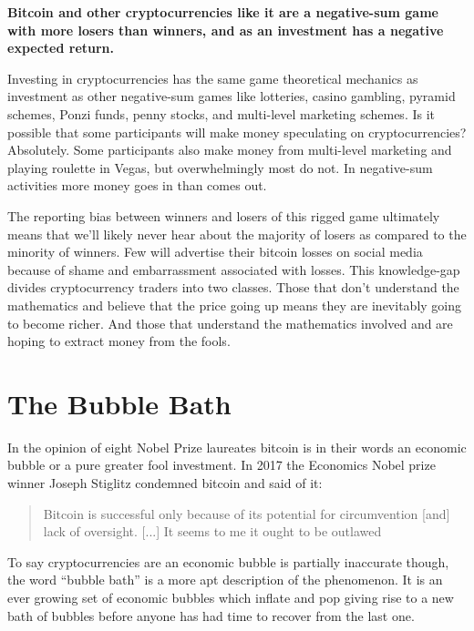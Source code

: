\begin{infobox}
 \textbf{Bitcoin and other cryptocurrencies like it are a negative-sum game with
  more losers than winners, and as an investment has a negative expected
  return.}
\end{infobox}


Investing in cryptocurrencies has the same game theoretical mechanics as
investment as other negative-sum games like lotteries, casino gambling, pyramid
schemes, Ponzi funds, penny stocks, and multi-level marketing schemes. Is it
possible that some participants will make money speculating on cryptocurrencies?
Absolutely. Some participants also make money from multi-level marketing and
playing roulette in Vegas, but overwhelmingly most do not. In negative-sum
activities more money goes in than comes out.


The reporting bias between winners and losers of this rigged game ultimately
means that we'll likely never hear about the majority of losers as compared to
the minority of winners. Few will advertise their bitcoin losses on social media
because of shame and embarrassment associated with losses. This knowledge-gap
divides cryptocurrency traders into two classes. Those that don't understand the
mathematics and believe that the price going up means they are inevitably going
to become richer. And those that understand the mathematics involved and are
hoping to extract money from the fools.
\cite{shifflett2018some, makarov2020trading}


\section{The Bubble Bath}


In the opinion of eight Nobel Prize laureates bitcoin is in their words an
economic bubble or a pure greater fool investment. In 2017 the Economics Nobel
prize winner Joseph Stiglitz condemned bitcoin and said of it:

\begin{quote}
Bitcoin is successful only because of its potential for circumvention [and] lack
of oversight. [...] It seems to me it ought to be outlawed
\end{quote}

To say cryptocurrencies are an economic bubble is partially inaccurate though,
the word ``bubble bath'' is a more apt description of the phenomenon. It is an
ever growing set of economic bubbles which inflate and pop giving rise to a new
bath of bubbles before anyone has had time to recover from the last one.

